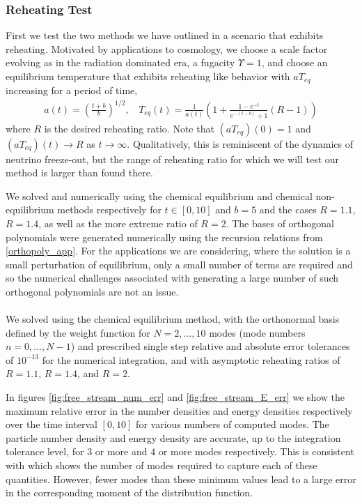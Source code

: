 \subsubsection{Reheating Test}
First we test the two methods we have outlined in a scenario that exhibits reheating.  Motivated by applications to cosmology, we choose a scale factor evolving as in the radiation dominated era, a fugacity $\Upsilon=1$, and choose an equilibrium temperature that exhibits reheating like behavior with $aT_{eq}$ increasing for a period of time,
\begin{align}\label{a_T_def}
a(t)=\left(\frac{t+b}{b}\right)^{1/2}\!\!\!,\ \  \ \
T_{eq}(t)=\frac{1}{a(t)}\left(1+\frac{1-e^{-t}}{e^{-(t-b)}+1}(R-1)\right)
\end{align}
where $R$ is the desired reheating ratio. Note that $(aT_{eq})(0)=1$ and $(aT_{eq})(t)\rightarrow R$ as $t\rightarrow\infty$. Qualitatively, this is reminiscent of the dynamics of neutrino freeze-out, but the range of reheating ratio for which we will test our method is larger than found there.

We solved  and  numerically using the chemical equilibrium and chemical non-equilibrium methods respectively for $t\in[0,10]$ and $b=5$ and the cases $R=1.1$, $R=1.4$, as well as the more extreme ratio of $R=2$.  The bases of orthogonal polynomials were generated numerically using the recursion relations from \ref{orthopoly_app}.  For the applications we are considering, where the solution is a small perturbation of equilibrium, only a small number of terms are required and so the numerical challenges associated with generating a large number of such orthogonal polynomials are not an issue.\\

\\
We solved  using the chemical equilibrium method, with the orthonormal basis defined by the weight function  for $N=2,...,10$ modes (mode numbers $n=0,...,N-1$) and prescribed  single step relative and absolute error tolerances of $10^{-13}$ for the numerical integration, and with asymptotic reheating ratios of $R=1.1$, $R=1.4$, and $R=2$.   



In figures   \ref{fig:free_stream_num_err} and  \ref{fig:free_stream_E_err} we show the maximum relative error in the number densities and energy densities respectively over the time interval $[0,10]$ for various numbers of computed modes.  The particle number density and energy density are accurate, up to the integration tolerance level, for $3$ or more and $4$ or more modes respectively. This is consistent with  which shows the number of modes required to capture each of these quantities. However, fewer modes than these minimum values lead to a large error in the corresponding moment of the distribution function.



